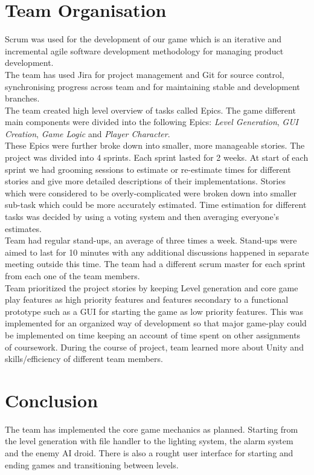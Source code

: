 \documentclass[11pt]{article}
\begin{document}
\section{Team Organisation}
Scrum was used for the development of our game which is an iterative and incremental agile software development methodology for managing product development.\\

The team has used Jira for project management and Git for source control, synchronising progress across team and for maintaining stable and development branches.\\

The team created high level overview of tasks called Epics. The game different main components were divided into the following Epics: \textit{Level Generation}, \textit{GUI Creation}, \textit{Game Logic} and \textit{Player Character}.\\

These Epics were further broke down into smaller, more manageable stories. The project was divided into 4 sprints. Each sprint lasted for 2 weeks. At start of each sprint we had grooming sessions to estimate or re-estimate times for different stories and give more detailed descriptions of their implementations. Stories which were considered to be overly-complicated were broken down into smaller sub-task which could be more accurately estimated. Time estimation for different tasks was decided by using a voting system and then averaging everyone's estimates.\\

Team had regular stand-ups, an average of three times a week. Stand-ups were aimed to last for 10 minutes with any additional discussions happened in separate meeting outside this time. The team had a different scrum master for each sprint from each one of the team members.\\

Team prioritized the project stories by keeping Level generation and core game play features as high priority features and features secondary to a functional prototype such as a GUI for starting the game as low priority features. This was implemented for an organized way of development so that major game-play could be implemented on time keeping an account of time spent on other assignments of coursework. During the course of project, team learned more about Unity and skills/efficiency of different team members.

\section{Conclusion}
The team has implemented the core game mechanics as planned. Starting from the level generation with file handler to the lighting system, the alarm system and the enemy AI droid. There is also a rought user interface for starting and ending games and transitioning between levels.\\
\end{document}
